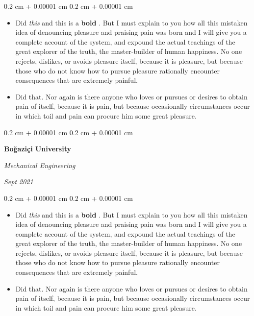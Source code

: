 \documentclass[10pt, letterpaper]{article}
\newenvironment{highlights}{
    \begin{itemize}[
        topsep=0.10 cm,
        parsep=0.10 cm,
        partopsep=0pt,
        itemsep=0pt,
        leftmargin=0.4 cm + 10pt
    ]
}{
    \end{itemize}
} %
\newenvironment{onecolentry}{
    \begin{adjustwidth}{
        0.2 cm + 0.00001 cm
    }{
        0.2 cm + 0.00001 cm
    }
}{
    \end{adjustwidth}
} %
\newenvironment{twocolentry}[2][]{
    \onecolentry
    \def\secondColumn{#2}
    \setcolumnwidth{\fill, 4.5 cm}
    \begin{paracol}{2}
}{
    \switchcolumn \raggedleft \secondColumn
    \end{paracol}
    \endonecolentry
} %
\let\hrefWithoutArrow\href
\renewcommand{\href}[2]{\hrefWithoutArrow{#1}{\ifthenelse{\equal{#2}{}}{ }{#2 }\raisebox{.15ex}{\footnotesize \faExternalLink*}}}
\begin{document}
        \vspace{0.10 cm}
        \begin{onecolentry}
            \begin{highlights}
                \item Did \textit{this} and this is a \textbf{bold} \href{https://example.com}{link}. But I must explain to you how all this mistaken idea of denouncing pleasure and praising pain was born and I will give you a complete account of the system, and expound the actual teachings of the great explorer of the truth, the master-builder of human happiness. No one rejects, dislikes, or avoids pleasure itself, because it is pleasure, but because those who do not know how to pursue pleasure rationally encounter consequences that are extremely painful.
                \item Did that. Nor again is there anyone who loves or pursues or desires to obtain pain of itself, because it is pain, but because occasionally circumstances occur in which toil and pain can procure him some great pleasure.
            \end{highlights}
        \end{onecolentry}


        \vspace{0.2 cm}

        \begin{twocolentry}{
            
            
        \textit{Sept 2021}}
            \textbf{Boğaziçi University}

            \textit{Mechanical Engineering}
        \end{twocolentry}

        \vspace{0.10 cm}
        \begin{onecolentry}
            \begin{highlights}
                \item Did \textit{this} and this is a \textbf{bold} \href{https://example.com}{link}. But I must explain to you how all this mistaken idea of denouncing pleasure and praising pain was born and I will give you a complete account of the system, and expound the actual teachings of the great explorer of the truth, the master-builder of human happiness. No one rejects, dislikes, or avoids pleasure itself, because it is pleasure, but because those who do not know how to pursue pleasure rationally encounter consequences that are extremely painful.
                \item Did that. Nor again is there anyone who loves or pursues or desires to obtain pain of itself, because it is pain, but because occasionally circumstances occur in which toil and pain can procure him some great pleasure.
            \end{highlights}
        \end{onecolentry}
\end{document}
